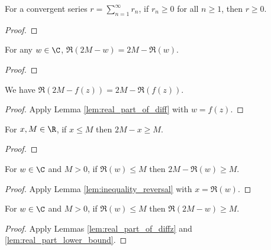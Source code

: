 \begin{lemma}\label{lem:seriesPos}  \leanok
For a convergent series $r=\sum_{n=1}^\infty r_n$, if $r_n\ge0$ for all $n\ge1$, then $r\ge0$.
\end{lemma}
\begin{proof} \leanok
\end{proof}


\begin{lemma}\label{lem:real_part_of_diff}  \leanok
For any $w \in \C$, $\Re(2M-w) = 2M - \Re(w)$.
\end{lemma}
\begin{proof}  \leanok
\end{proof}

\begin{lemma}\label{lem:real_part_of_diffz}  \leanok
We have $\Re(2M-f(z)) = 2M - \Re(f(z))$.
\end{lemma}
\begin{proof}  \leanok
Apply Lemma \ref{lem:real_part_of_diff} with $w=f(z)$.
\end{proof}

\begin{lemma}\label{lem:inequality_reversal}  \leanok
For $x, M\in\R$, if $x \le M$ then $2M-x \ge M$.
\end{lemma}
\begin{proof} \leanok
\end{proof}

\begin{lemma}\label{lem:real_part_lower_bound}  \leanok
For $w\in\C$ and $M>0$, if $\Re(w) \le M$ then $2M-\Re(w) \ge M$.
\end{lemma}
\begin{proof} \leanok {}
Apply Lemma \ref{lem:inequality_reversal} with $x=\Re(w)$.
\end{proof}

\begin{lemma}\label{lem:real_part_lower_bound2}  \leanok
For $w\in\C$ and $M>0$, if $\Re(w) \le M$ then $\Re(2M - w) \ge M$.
\end{lemma}
\begin{proof} \leanok {}
Apply Lemmas \ref{lem:real_part_of_diffz} and \ref{lem:real_part_lower_bound}.
\end{proof}

